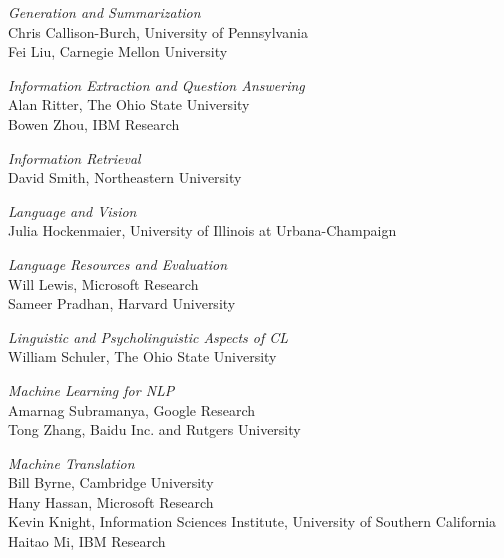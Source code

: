 \emph{Generation and Summarization} \\
\hspace*{0.2in} Chris Callison-Burch, University of Pennsylvania \\
\hspace*{0.2in} Fei Liu, Carnegie Mellon University

\emph{Information Extraction and Question Answering} \\
\hspace*{0.2in} Alan Ritter, The Ohio State University \\
\hspace*{0.2in} Bowen Zhou, IBM Research

\emph{Information Retrieval} \\
\hspace*{0.2in} David Smith, Northeastern University

\emph{Language and Vision} \\
\hspace*{0.2in} Julia Hockenmaier, University of Illinois at Urbana-Champaign

\emph{Language Resources and Evaluation} \\
\hspace*{0.2in} Will Lewis, Microsoft Research \\
\hspace*{0.2in} Sameer Pradhan, Harvard University

\emph{Linguistic and Psycholinguistic Aspects of CL} \\
\hspace*{0.2in} William Schuler, The Ohio State University

\emph{Machine Learning for NLP} \\
\hspace*{0.2in} Amarnag Subramanya, Google Research \\
\hspace*{0.2in} Tong Zhang, Baidu Inc. and Rutgers University

\emph{Machine Translation} \\
\hspace*{0.2in} Bill Byrne, Cambridge University \\
\hspace*{0.2in} Hany Hassan, Microsoft Research \\
\hspace*{0.2in} Kevin Knight, Information Sciences Institute, University of Southern California \\
\hspace*{0.2in} Haitao Mi, IBM Research

